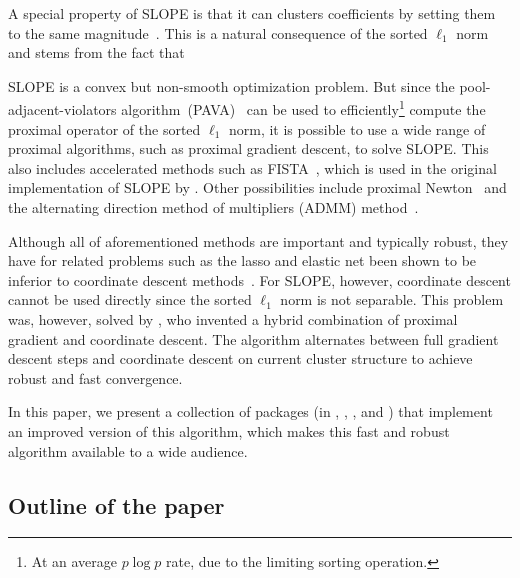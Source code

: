 \documentclass[article]{jss}
\begin{document}


A special property of SLOPE is that it can clusters coefficients by
setting them to the same magnitude~\citep{figueiredo2016,bogdan2022}. This is a natural
consequence of the sorted \(\ell_1\) norm and stems from the fact that

SLOPE is a convex but non-smooth optimization problem. But since the
pool-adjacent-violators algorithm~(PAVA)~\citep{barlow1972} can be used to
efficiently\footnote{At an average \(p \log p\) rate, due to the limiting
  sorting operation.} compute the proximal operator of the sorted \(\ell_1\)
norm, it is possible to use a wide range of proximal algorithms, such
as proximal gradient descent, to solve SLOPE. This also includes accelerated
methods such as FISTA~\citep{beck2009}, which is used in the original
implementation of SLOPE by \citet{bogdan2015}. Other possibilities include
proximal Newton~\citep{lee2014} and the alternating direction method of
multipliers (ADMM) method~\citep{boyd2010}.

Although all of aforementioned methods are important and typically robust, they
have for related problems such as the lasso and elastic net been shown to be
inferior to coordinate descent methods~\citep{friedman2007,friedman2010}. For
SLOPE, however, coordinate descent cannot be used directly since the sorted
\(\ell_1\) norm is not separable. This problem was, however, solved by
\citet{larsson2023}, who invented a hybrid combination of proximal gradient and
coordinate descent. The algorithm alternates between full gradient descent
steps and coordinate descent on current cluster structure to achieve robust and
fast convergence.

In this paper, we present a collection of packages (in ,
, , and ) that implement an
improved version of this algorithm, which makes this fast and robust algorithm
available to a wide audience.

\subsection{Outline of the paper}
\end{document}
